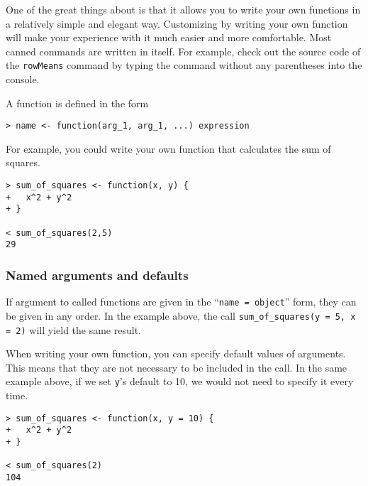 One of the great things about \R is that it allows you to write your own functions in a relatively simple and elegant way. Customizing \R by writing your own function will make your experience with it much easier and more comfortable. Most canned commands are written in \R itself. For example, check out the source code of the \texttt{rowMeans} command by typing the command without any parentheses into the console.

A function is defined in the form

\begin{lstlisting}
> name <- function(arg_1, arg_1, ...) expression
\end{lstlisting}

For example, you could write your own function that calculates the sum of squares.

\begin{lstlisting}
> sum_of_squares <- function(x, y) {
+   x^2 + y^2
+ }

< sum_of_squares(2,5)
29
\end{lstlisting}

\subsubsection*{Named arguments and defaults}

If argument to called functions are given in the ``\texttt{name = object}'' form, they can be given in any order. In the example above, the call \verb|sum_of_squares(y = 5, x = 2)| will yield the same result.

When writing your own function, you can specify default values of arguments. This means that they are not necessary to be included in the call. In the same example above, if we set \texttt{y}'s default to 10, we would not need to specify it every time.

\begin{lstlisting}
> sum_of_squares <- function(x, y = 10) {
+   x^2 + y^2
+ }

< sum_of_squares(2)
104
\end{lstlisting}
